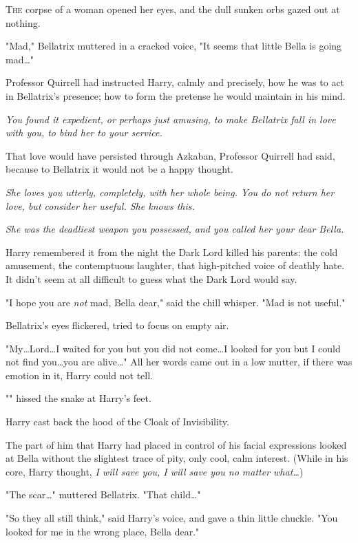 
\lettrine{T}{he} corpse of a
woman opened her eyes, and the dull sunken orbs gazed out at nothing.

"Mad," Bellatrix muttered in a cracked voice, "It seems that little Bella is
going mad…"

Professor Quirrell had instructed Harry, calmly and precisely, how he was to
act in Bellatrix’s presence; how to form the pretense he would maintain in his
mind.

\emph{You found it expedient, or perhaps just amusing, to make Bellatrix fall
in love with you, to bind her to your service.}

That love would have persisted through Azkaban, Professor Quirrell had said,
because to Bellatrix it would not be a happy thought.

\emph{She loves you utterly, completely, with her whole being. You do not
return her love, but consider her useful. She knows this.}

\emph{She was the deadliest weapon you possessed, and you called her your dear
Bella.}

Harry remembered it from the night the Dark Lord killed his parents: the cold
amusement, the contemptuous laughter, that high-pitched voice of deathly hate.
It didn’t seem at all difficult to guess what the Dark Lord would say.

"I hope you are \emph{not} mad, Bella dear," said the chill whisper. "Mad is
not useful."

Bellatrix’s eyes flickered, tried to focus on empty air.

"My…Lord…I waited for you but you did not come…I looked
for you but I could not find you…you are alive…" All her words
came out in a low mutter, if there was emotion in it, Harry could not tell.

"" hissed the snake at Harry’s feet.

Harry cast back the hood of the Cloak of Invisibility.

The part of him that Harry had placed in control of his facial expressions
looked at Bella without the slightest trace of pity, only cool, calm interest.
(While in his core, Harry thought, \emph{I will save you, I will save you no
matter what…})

"The scar…" muttered Bellatrix. "That child…"

"So they all still think," said Harry’s voice, and gave a thin little chuckle.
"You looked for me in the wrong place, Bella dear."

